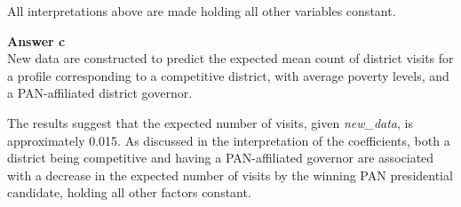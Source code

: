 \documentclass[12pt,letterpaper]{article}
\begin{document}
\noindent All interpretations above are made holding all other variables constant.

\vspace{0.5cm}
\noindent\textbf{Answer c}\\
\vspace{0.5cm}
\noindent New data are constructed to predict the expected mean count of district visits for a profile corresponding to a competitive district, with average poverty levels, and a PAN-affiliated district governor.

\vspace{0.5cm}

\vspace{0.5cm}

\noindent The results suggest that the expected number of visits, given \emph{new\_data}, is approximately 0.015. As discussed in the interpretation of the coefficients, both a district being competitive and having a PAN-affiliated governor are associated with a decrease in the expected number of visits by the winning PAN presidential candidate, holding all other factors constant.
\end{document}
